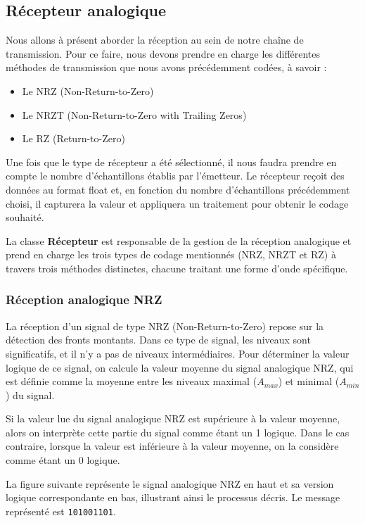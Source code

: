\subsection{Récepteur analogique}

Nous allons à présent aborder la réception au sein de notre chaîne de transmission. Pour ce faire, nous devons prendre en charge les différentes méthodes de transmission que nous avons précédemment codées, à savoir :

\begin{itemize}
    \item Le NRZ (Non-Return-to-Zero)
    \item Le NRZT (Non-Return-to-Zero with Trailing Zeros)
    \item Le RZ (Return-to-Zero)
\end{itemize}

Une fois que le type de récepteur a été sélectionné, il nous faudra prendre en compte le nombre d'échantillons établis par l'émetteur. Le récepteur reçoit des données au format float et, en fonction du nombre d'échantillons précédemment choisi, il capturera la valeur et appliquera un traitement pour obtenir le codage souhaité.

La classe \textbf{Récepteur} est responsable de la gestion de la réception analogique et prend en charge les trois types de codage mentionnés (NRZ, NRZT et RZ) à travers trois méthodes distinctes, chacune traitant une forme d'onde spécifique.

\subsubsection{Réception analogique NRZ}

La réception d'un signal de type NRZ (Non-Return-to-Zero) repose sur la détection des fronts montants. Dans ce type de signal, les niveaux sont significatifs, et il n'y a pas de niveaux intermédiaires. Pour déterminer la valeur logique de ce signal, on calcule la valeur moyenne du signal analogique NRZ, qui est définie comme la moyenne entre les niveaux maximal ($A_{max}$) et minimal ($A_{min}$) du signal.

Si la valeur lue du signal analogique NRZ est supérieure à la valeur moyenne, alors on interprète cette partie du signal comme étant un 1 logique. Dans le cas contraire, lorsque la valeur est inférieure à la valeur moyenne, on la considère comme étant un 0 logique.

La figure suivante représente le signal analogique NRZ en haut et sa version logique correspondante en bas, illustrant ainsi le processus décris. Le message représenté est \texttt{101001101}.

